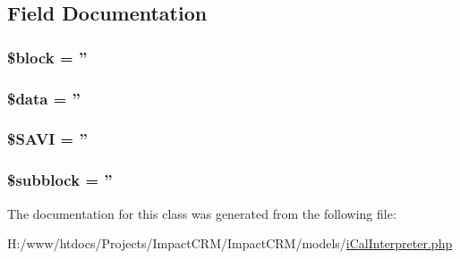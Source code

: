 \subsection{Field Documentation}
\hypertarget{classIcal__Interpreter_a7f8f86b37cd48a37bf0df573d8512d11}{
\subsubsection[{\$block}]{\setlength{\rightskip}{0pt plus 5cm}\$block = ''}}
\label{classIcal__Interpreter_a7f8f86b37cd48a37bf0df573d8512d11}
\hypertarget{classIcal__Interpreter_a6efc15b5a2314dd4b5aaa556a375c6d6}{
\subsubsection[{\$data}]{\setlength{\rightskip}{0pt plus 5cm}\$data = ''}}
\label{classIcal__Interpreter_a6efc15b5a2314dd4b5aaa556a375c6d6}
\hypertarget{classIcal__Interpreter_a6b1385559f5a7063aaf24688452c5d55}{
\subsubsection[{\$SAVI}]{\setlength{\rightskip}{0pt plus 5cm}\$SAVI = ''}}
\label{classIcal__Interpreter_a6b1385559f5a7063aaf24688452c5d55}
\hypertarget{classIcal__Interpreter_a2d499c39518df37e2759becba8383526}{
\subsubsection[{\$subblock}]{\setlength{\rightskip}{0pt plus 5cm}\$subblock = ''}}
\label{classIcal__Interpreter_a2d499c39518df37e2759becba8383526}


The documentation for this class was generated from the following file:\begin{DoxyCompactItemize}
\item 
H:/www/htdocs/Projects/ImpactCRM/ImpactCRM/models/\hyperlink{iCalInterpreter_8php}{iCalInterpreter.php}\end{DoxyCompactItemize}
